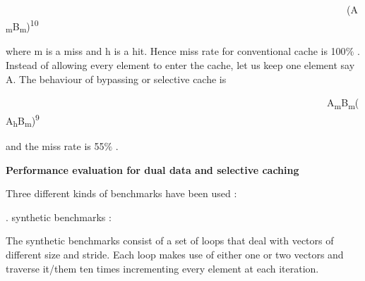 \documentclass[12pt]{article}
\begin{document}
{\fontsize{10pt}{12.0pt}\selectfont \ \ \ \ \ \ \ \ \ \ \ \ \ \ \ \ \ \ \ \ \ \ \ \ \ \ \ \ \ \ \ \ \ \ \ \ \ \ \ \ \ \ \ \ \ \ \ \ \ \ \ \ \ \ \ \ \ \ \ \ \ \ \ \ \ \ \ \ \  (A\textsubscript{m}B\textsubscript{m})\textsuperscript{10}\par}\par

{\fontsize{10pt}{12.0pt}\selectfont where m is a miss and h is a hit. Hence miss rate for conventional cache is 100$\%$ . Instead of allowing every element to enter the cache, let us keep one element say A. The behaviour of bypassing or selective cache is \par}\par

{\fontsize{10pt}{12.0pt}\selectfont \ \ \ \ \ \ \ \ \ \ \ \ \ \ \ \ \ \ \ \ \ \ \ \ \ \ \ \ \ \ \ \ \ \ \ \ \ \ \ \ \ \ \ \ \ \ \ \ \ \ \ \ \ \ \ \ \ \ \ \ \ \ \ \ \  A\textsubscript{m}B\textsubscript{m}(A\textsubscript{h}B\textsubscript{m})\textsuperscript{9}\par}\par

{\fontsize{10pt}{12.0pt}\selectfont and the miss rate is 55$\%$ .\par}\par

{\fontsize{16pt}{19.2pt}\selectfont \textbf{Performance evaluation for dual data and selective caching}\par}\par

{\fontsize{10pt}{12.0pt}\selectfont Three different kinds of benchmarks have been used :\par}\par

{\fontsize{14pt}{16.8pt}. synthetic benchmarks :{\fontsize{16pt}{19.2pt}\selectfont  \par}\par}The synthetic benchmarks consist of a set of loops that deal with vectors of different size and stride. Each loop makes use of either one or two vectors and traverse it/them ten times incrementing every element at each iteration.\par



\end{document}
